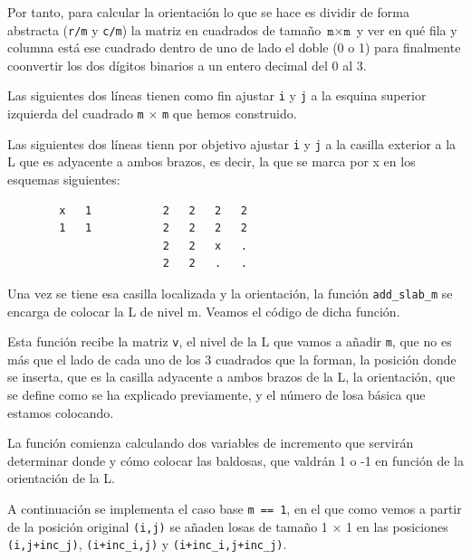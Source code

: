 \documentclass{article}
\begin{document}
    Por tanto, para calcular la orientación lo que se hace es dividir de 
    forma abstracta (\texttt{r/m} y \texttt{c/m})
    la matriz en cuadrados de tamaño $\texttt{m} \times \texttt{m}$ y ver en qué fila y
    columna está ese cuadrado dentro de uno de lado el doble (0 o 1) para
    finalmente coonvertir los dos dígitos binarios a un entero decimal
    del 0 al 3.

    Las siguientes dos líneas tienen como fin ajustar \texttt{i} y \texttt{j} a
    la esquina superior izquierda del cuadrado \texttt{m} $\times$ \texttt{m} que hemos
    construido.

    Las siguientes dos líneas tienn por objetivo ajustar \texttt{i} y \texttt{j} a la
    casilla exterior a la L que es adyacente a ambos brazos, es decir,
    la que se marca por x en los esquemas siguientes: \\
    \begin{verbatim}
        x   1           2   2   2   2
        1   1           2   2   2   2
                        2   2   x   .
                        2   2   .   .        
    \end{verbatim}
    Una vez se tiene esa casilla localizada y la orientación, la función
    \texttt{add\_slab\_m} se encarga de colocar la L de nivel m. Veamos
    el código de dicha función.

    

    Esta función recibe la matriz \texttt{v}, el nivel de la L que vamos
    a añadir \texttt{m}, que no es más que el lado de cada uno de los 3
    cuadrados que la forman, la posición donde se inserta, que es la casilla
    adyacente a ambos brazos de la L, la orientación, que se define como
    se ha explicado previamente, y el número de losa básica que estamos 
    colocando.

    La función comienza calculando dos variables de incremento que servirán
    determinar donde y cómo colocar las baldosas, que valdrán 1 o -1 en
    función de la orientación de la L.

    A continuación se implementa el caso base \texttt{m == 1}, en el que
    como vemos a partir de la posición original \texttt{(i,j)} se añaden
    losas de tamaño 1 $\times$ 1 en las posiciones \texttt{(i,j+inc\_j)}, 
    \texttt{(i+inc\_i,j)} y \texttt{(i+inc\_i,j+inc\_j)}.
\end{document}
